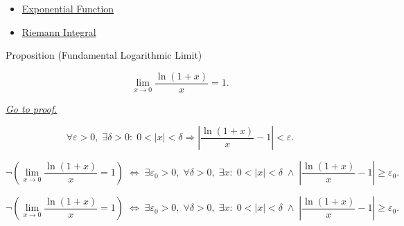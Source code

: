 \begin{dependencies}
\begin{itemize}
  \item \hyperref[def:exponential]{Exponential Function}
  \item \hyperref[def:riemann-integral]{Riemann Integral}
\end{itemize}
\end{dependencies}


\begin{propositionbox}{Proposition (Fundamental Logarithmic Limit)}
\begin{proposition}
\label{prop:limit-logarithm-fundamental}
\[
  \lim_{x \to 0} \frac{\ln(1+x)}{x} = 1.
\]

\smallskip\noindent


\hyperref[prf:limit-logarithm-fundamental]{\textit{Go to proof.}}
\end{proposition}
\end{propositionbox}

\begin{remark*}
\[
  \forall\varepsilon > 0,\;
  \exists\delta > 0 :\;
  0 < |x| < \delta \Rightarrow
  \left|\frac{\ln(1+x)}{x} - 1\right| < \varepsilon.
\]
\end{remark*}

\begin{remark*}
\[
  \neg\left(\lim_{x\to 0}\frac{\ln(1+x)}{x}=1\right)
  \;\iff\;
  \exists\varepsilon_0>0,\;\forall\delta>0,\;\exists x:\;
  0<|x|<\delta \;\wedge\;
  \left|\frac{\ln(1+x)}{x}-1\right|\geq\varepsilon_0.
\]
\end{remark*}

\begin{remark*}
\[
\neg\left(\lim_{x\to 0}\frac{\ln(1+x)}{x}=1\right)
  \;\iff\;
  \exists\varepsilon_0>0,\;\forall\delta>0,\;\exists x:\;
  0<|x|<\delta \;\wedge\;
  \left|\frac{\ln(1+x)}{x}-1\right|\geq\varepsilon_0.
\]
\end{remark*}

